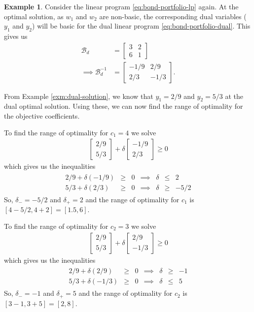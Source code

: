 \documentclass[
]{book}
\theoremstyle{definition}
\theoremstyle{definition}
\newtheorem{example}{Example}[chapter]
\theoremstyle{definition}
\theoremstyle{definition}
\theoremstyle{remark}
\begin{document}
\begin{example}
Consider the linear program \eqref{eq:bond-portfolio-lp} again. At the optimal solution, as \(w_1\) and \(w_2\) are non-basic, the corresponding dual variables (\(y_1\) and \(y_2\)) will be basic for the dual linear program \eqref{eq:bond-portfolio-dual}. This gives us
\begin{align*}
  \mathcal{B}_d &= \begin{bmatrix} 3 & 2 \\ 6 & 1 \end{bmatrix} \\
  \implies 
  \mathcal{B}_d^{-1} &= \begin{bmatrix} -1/9 & 2/9 \\ 2/3 & -1/3 \end{bmatrix}.
\end{align*}

From Example \ref{exm:dual-solution}, we know that \(y_1 = 2/9\) and \(y_2 = 5/3\) at the dual optimal
solution. Using these, we can now find the range of optimality for the objective coefficients.

To find the range of optimality for \(c_1 = 4\) we solve
\begin{align*}
  \begin{bmatrix} 2/9 \\ 5/3 \end{bmatrix} 
  + 
  \delta \begin{bmatrix} -1/9 \\ 2/3 \end{bmatrix} \ge 0
\end{align*}
which gives us the inequalities
\begin{align*}
  \begin{array}{lrlrrll}
  2/9 + \delta (-1/9) & \ge & 0 & \implies & \delta & \le & 2 \\
  5/3 + \delta (2/3) & \ge & 0 & \implies & \delta & \ge & -5/2
  \end{array}
\end{align*}
So, \(\delta_- = -5/2\) and \(\delta_+ = 2\) and the range of optimality for \(c_1\) is \([4 - 5/2, 4 + 2] = [1.5, 6]\).

To find the range of optimality for \(c_2 = 3\) we solve
\begin{align*}
  \begin{bmatrix} 2/9 \\ 5/3 \end{bmatrix} 
  + 
  \delta \begin{bmatrix} 2/9 \\ -1/3 \end{bmatrix} \ge 0
\end{align*}
which gives us the inequalities
\begin{align*}
  \begin{array}{lrlrrll}
  2/9 + \delta (2/9) & \ge & 0 & \implies & \delta & \ge & -1 \\
  5/3 + \delta (-1/3) & \ge & 0 & \implies & \delta & \le & 5
  \end{array}
\end{align*}
So, \(\delta_- = -1\) and \(\delta_+ = 5\) and the range of optimality for \(c_2\) is \([3 - 1, 3 + 5] = [2, 8]\).


\end{example}
\end{document}
